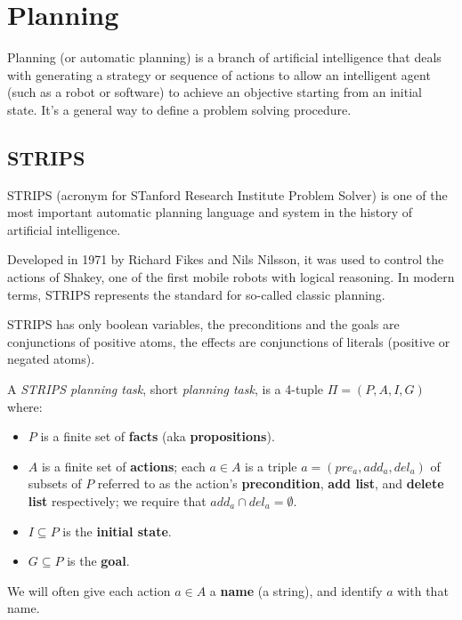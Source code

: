 \documentclass[10pt, letterpaper]{report}
\begin{document}
\chapter{Planning}
Planning (or automatic planning) is a branch of artificial intelligence that deals with generating a strategy or sequence of actions to allow an intelligent agent (such as a robot or software) to achieve an objective starting from an initial state. It's a general way to define a problem solving procedure.
\section{STRIPS}
STRIPS (acronym for STanford Research Institute Problem Solver) is one of the most important automatic planning language and system in the history of artificial intelligence.

Developed in 1971 by Richard Fikes and Nils Nilsson, it was used to control the actions of Shakey, one of the first mobile robots with logical reasoning. In modern terms, STRIPS represents the standard for so-called classic planning.\bigskip 

STRIPS has only boolean variables, the preconditions and the goals are conjunctions of positive atoms, the effects are conjunctions of literals (positive or negated atoms).
\begin{definition}
A \textit{STRIPS planning task}, short \textit{planning task}, is a 4-tuple $\Pi = (P, A, I, G)$ where:

\begin{itemize}
    \item $P$ is a finite set of \textbf{facts} (aka \textbf{propositions}).
    \item $A$ is a finite set of \textbf{actions}; each $a \in A$ is a triple $a = (pre_a, add_a, del_a)$ of subsets of $P$ referred to as the action's \textbf{precondition}, \textbf{add list}, and \textbf{delete list} respectively; we require that $add_a \cap del_a = \emptyset$.
    \item $I \subseteq P$ is the \textbf{initial state}.
    \item $G \subseteq P$ is the \textbf{goal}.
\end{itemize}
\end{definition}
We will often give each action $a \in A$ a \textbf{name} (a string), and identify $a$ with that name.\bigskip
\end{document}
